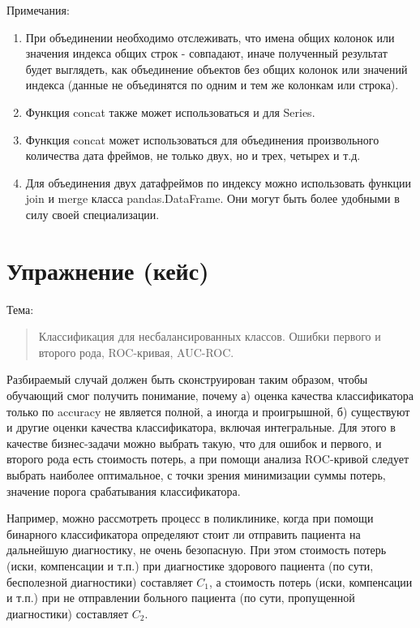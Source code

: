 \documentclass[a4paper,12pt]{article}
\begin{document}
{\color{red} \faExclamation} Примечания:

\begin{enumerate}
\item При объединении необходимо отслеживать, что имена общих колонок или значения индекса общих строк - совпадают, иначе полученный результат будет выглядеть, как объединение объектов без общих колонок или значений индекса (данные не объединятся по одним и тем же колонкам или строка).
\item Функция concat также может использоваться и для Series.
\item Функция concat может использоваться для объединения произвольного количества дата фреймов, не только двух, но и трех, четырех и т.д.
\item Для объединения двух датафреймов по индексу можно использовать функции join и merge класса pandas.DataFrame. Они могут быть более удобными в силу своей специализации.
\end{enumerate}

\section{Упражнение (кейс)}

Тема:
\begin{quote}
Классификация для несбалансированных классов. Ошибки первого и второго рода, ROC-кривая, AUC-ROC.
\end{quote}

Разбираемый случай должен быть сконструирован таким образом, чтобы обучающий смог получить понимание, почему а) оценка качества классификатора только по accuracy не является полной, а иногда и проигрышной, б) существуют и другие оценки качества классификатора, включая интегральные. Для этого в качестве бизнес-задачи можно выбрать такую, что для ошибок и первого, и второго рода есть стоимость потерь, а при помощи анализа ROC-кривой следует выбрать наиболее оптимальное, с точки зрения минимизации суммы потерь, значение порога срабатывания классификатора.

Например, можно рассмотреть процесс в поликлинике, когда при помощи бинарного классификатора определяют стоит ли отправить пациента на дальнейшую диагностику, не очень безопасную. При этом стоимость потерь (иски, компенсации и т.п.) при диагностике здорового пациента (по сути, бесполезной диагностики) составляет $C_1$, а стоимость потерь (иски, компенсации и т.п.) при не отправлении больного пациента (по сути, пропущенной диагностики) составляет $C_2$. 
\end{document}
